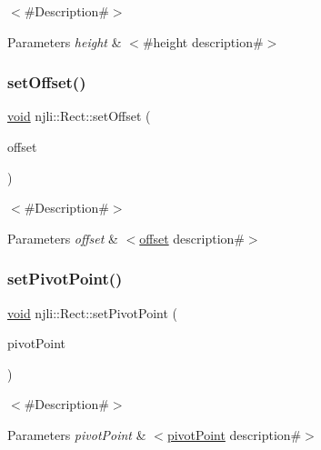 $<$\#\+Description\#$>$


\begin{DoxyParams}{Parameters}
{\em height} & $<$\#height description\#$>$ \\
\hline
\end{DoxyParams}
\mbox{\label{classnjli_1_1_rect_a3f348042c8ae89746202bc6b2e4ae682}} 
\subsubsection{\texorpdfstring{set\+Offset()}{setOffset()}}
{\footnotesize\ttfamily \mbox{\hyperlink{_thread_8h_af1e856da2e658414cb2456cb6f7ebc66}{void}} njli\+::\+Rect\+::set\+Offset (\begin{DoxyParamCaption}\item[{const bt\+Vector2 \&}]{offset }\end{DoxyParamCaption})}

$<$\#\+Description\#$>$


\begin{DoxyParams}{Parameters}
{\em offset} & $<$\mbox{\hyperlink{classnjli_1_1_rect_a6f23c542bdc39901ed8fdb494f3be56f}{offset}} description\#$>$ \\
\hline
\end{DoxyParams}
\mbox{\label{classnjli_1_1_rect_ad5edbced1c61688846d9a658673ff5e9}} 
\subsubsection{\texorpdfstring{set\+Pivot\+Point()}{setPivotPoint()}}
{\footnotesize\ttfamily \mbox{\hyperlink{_thread_8h_af1e856da2e658414cb2456cb6f7ebc66}{void}} njli\+::\+Rect\+::set\+Pivot\+Point (\begin{DoxyParamCaption}\item[{const bt\+Vector2 \&}]{pivot\+Point }\end{DoxyParamCaption})}

$<$\#\+Description\#$>$


\begin{DoxyParams}{Parameters}
{\em pivot\+Point} & $<$\mbox{\hyperlink{classnjli_1_1_rect_a5108b573ccf0471fe3df6d8b81409584}{pivot\+Point}} description\#$>$ \\
\hline
\end{DoxyParams}
\mbox{\label{classnjli_1_1_rect_aeaf093fbf6609d4c1b002b41d26af704}} 
